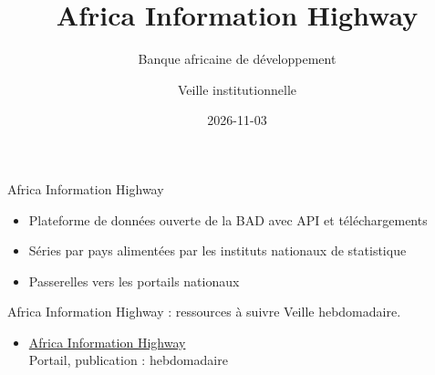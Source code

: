 \documentclass[aspectratio=169,11pt]{beamer}
\title{Africa Information Highway}
\subtitle{Banque africaine de développement}
\author{Veille institutionnelle}
\date{2026-11-03}
\begin{document}
\begin{frame}\titlepage\end{frame}

\begin{frame}{Africa Information Highway}
\begin{itemize}
\item Plateforme de données ouverte de la BAD avec API et téléchargements
\item Séries par pays alimentées par les instituts nationaux de statistique
\item Passerelles vers les portails nationaux
\end{itemize}
\end{frame}

\begin{frame}{Africa Information Highway : ressources à suivre}
\small
Veille hebdomadaire.
\begin{itemize}
\item \href{https://africaninfohighway.afdb.org}{Africa Information Highway}\\{\footnotesize Portail, publication : hebdomadaire}
\end{itemize}
\end{frame}
\end{document}
